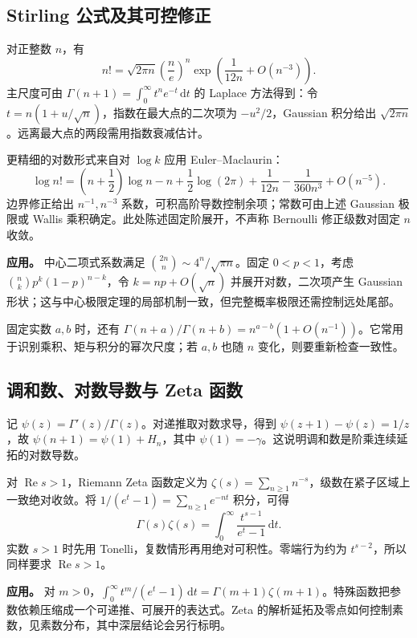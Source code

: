 \documentclass[UTF8,12pt,a4paper,fontset=fandol]{ctexart}
\begin{document}
\subsection{Stirling 公式及其可控修正}

\label{app:special-stirling}

对正整数 $n$，有
\[
n!=\sqrt{2\pi n}\left(\frac ne\right)^n
\exp\!\left(\frac1{12n}+O(n^{-3})\right).
\]
主尺度可由 $\Gamma(n+1)=\int_0^\infty t^ne^{-t}\,\mathrm dt$ 的 Laplace 方法得到：令 $t=n(1+u/\sqrt n)$，指数在最大点的二次项为 $-u^2/2$，Gaussian 积分给出 $\sqrt{2\pi n}$。远离最大点的两段需用指数衰减估计。

更精细的对数形式来自对 $\log k$ 应用 Euler--Maclaurin：
\[
\log n!=\left(n+\frac12\right)\log n-n+\frac12\log(2\pi)
+\frac1{12n}-\frac1{360n^3}+O(n^{-5}).
\]
边界修正给出 $n^{-1},n^{-3}$ 系数，可积高阶导数控制余项；常数可由上述 Gaussian 极限或 Wallis 乘积确定。此处陈述固定阶展开，不声称 Bernoulli 修正级数对固定 $n$ 收敛。

\textbf{应用。} 中心二项式系数满足 $\binom{2n}{n}\sim4^n/\sqrt{\pi n}$。固定 $0<p<1$，考虑 $\binom{n}{k}p^k(1-p)^{n-k}$，令 $k=np+O(\sqrt n)$ 并展开对数，二次项产生 Gaussian 形状；这与中心极限定理的局部机制一致，但完整概率极限还需控制远处尾部。

固定实数 $a,b$ 时，还有 $\Gamma(n+a)/\Gamma(n+b)=n^{a-b}(1+O(n^{-1}))$。它常用于识别乘积、矩与积分的幂次尺度；若 $a,b$ 也随 $n$ 变化，则要重新检查一致性。

\subsection{调和数、对数导数与 Zeta 函数}

\label{app:special-zeta}

记 $\psi(z)=\Gamma'(z)/\Gamma(z)$。对递推取对数求导，得到 $\psi(z+1)-\psi(z)=1/z$，故 $\psi(n+1)=\psi(1)+H_n$，其中 $\psi(1)=-\gamma$。这说明调和数是阶乘连续延拓的对数导数。

对 $\operatorname{Re}s>1$，Riemann Zeta 函数定义为 $\zeta(s)=\sum_{n\geq1}n^{-s}$，级数在紧子区域上一致绝对收敛。将 $1/(e^t-1)=\sum_{n\geq1}e^{-nt}$ 积分，可得
\[
\Gamma(s)\zeta(s)=\int_0^\infty\frac{t^{s-1}}{e^t-1}\,\mathrm dt.
\]
实数 $s>1$ 时先用 Tonelli，复数情形再用绝对可积性。零端行为约为 $t^{s-2}$，所以同样要求 $\operatorname{Re}s>1$。

\textbf{应用。} 对 $m>0$，$\int_0^\infty t^m/(e^t-1)\,\mathrm dt=\Gamma(m+1)\zeta(m+1)$。特殊函数把参数依赖压缩成一个可递推、可展开的表达式。Zeta 的解析延拓及零点如何控制素数，见素数分布，其中深层结论会另行标明。
\end{document}
